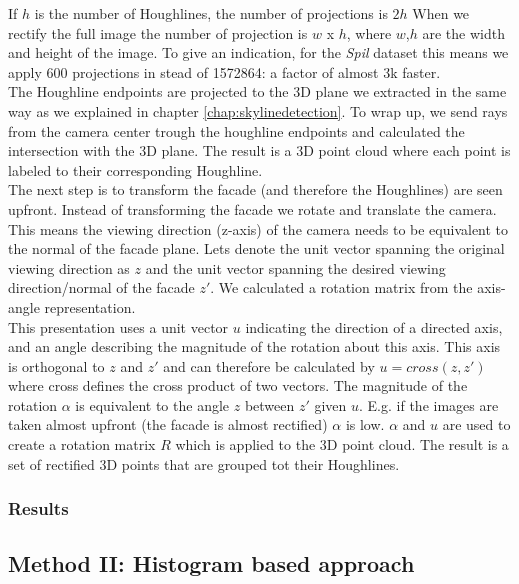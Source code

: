 If $h$ is the number of Houghlines, the number of projections is $2h$
When we rectify the full image the number of projection is $w$ x $h$, where $w$,$h$ are the width and height of
the image. To give an indication, for the \emph{Spil} dataset %
this means we apply 600 projections in stead of 1572864: a factor of almost 3k faster.\\


The Houghline endpoints are projected to the 3D plane we extracted in the same
way as we explained in chapter \ref{chap:skylinedetection}. To wrap up, we send
rays from the camera center trough the houghline endpoints and calculated the
intersection with the 3D plane.  The result is a 3D point cloud where each
point is labeled to their corresponding Houghline.\\

The next step is to transform the facade (and therefore the Houghlines) are
seen upfront. Instead of transforming the facade we rotate and translate the camera. 
This means the viewing direction (z-axis) of the camera needs
to be equivalent to the normal of the facade plane. Lets denote the
unit vector spanning the original viewing direction as $z$ and the
unit vector spanning the desired viewing direction/normal of the facade $z'$.
We calculated a rotation matrix from the axis-angle representation.\\

This presentation uses a unit vector $u$ indicating the direction of a directed axis, and an
angle describing the magnitude of the rotation about this axis.
This axis is orthogonal to $z$ and $z'$ and can therefore be
calculated by $u = cross(z,z')$ where cross defines the cross product of
two vectors.
The magnitude of the rotation $\alpha$ is equivalent to the angle $z$ between $z'$ given $u$. 
E.g. if the images are taken almost upfront (the facade is almost rectified) $\alpha$ is low.
$\alpha$ and $u$ are used to create a rotation matrix $R$ which is applied to the 3D point cloud.
The result is a set of rectified 3D points that are grouped tot their Houghlines.

\subsubsection{Results} %

\subsection{Method II: Histogram based approach} 
